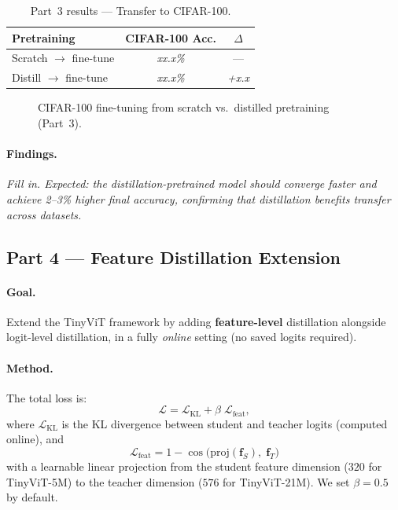 \documentclass[10pt,twocolumn]{article}
\begin{document}
\begin{table}[h]
\centering
\caption{Part~3 results --- Transfer to CIFAR-100.}
\label{tab:part3}
\small
\begin{tabular}{@{}lcc@{}}
\toprule
Pretraining & CIFAR-100 Acc. & $\Delta$ \\
\midrule
Scratch $\to$ fine-tune  & \textit{xx.x\%} & --- \\
Distill $\to$ fine-tune  & \textit{xx.x\%} & \textit{+x.x} \\
\bottomrule
\end{tabular}
\end{table}

\begin{figure}[h]
  \centering
  \caption{CIFAR-100 fine-tuning from scratch vs.\ distilled pretraining (Part~3).}
  \label{fig:part3}
\end{figure}

\paragraph{Findings.}
\textit{Fill in.
Expected: the distillation-pretrained model should converge faster and
achieve 2--3\% higher final accuracy, confirming that distillation
benefits transfer across datasets.}

\subsection{Part 4 --- Feature Distillation Extension}

\paragraph{Goal.}
Extend the TinyViT framework by adding \textbf{feature-level} distillation
alongside logit-level distillation, in a fully \emph{online} setting
(no saved logits required).

\paragraph{Method.}
The total loss is:
\begin{equation}
  \mathcal{L} = \mathcal{L}_{\text{KL}} + \beta\;\mathcal{L}_{\text{feat}},
  \label{eq:feature}
\end{equation}
where $\mathcal{L}_{\text{KL}}$ is the KL divergence between student and
teacher logits (computed online), and
\begin{equation}
  \mathcal{L}_{\text{feat}} = 1 - \cos\!\bigl(
    \mathrm{proj}(\mathbf{f}_S),\;\mathbf{f}_T
  \bigr)
\end{equation}
with a learnable linear projection from the student feature dimension
($320$ for TinyViT-5M) to the teacher dimension ($576$ for TinyViT-21M).
We set $\beta=0.5$ by default.
\end{document}

